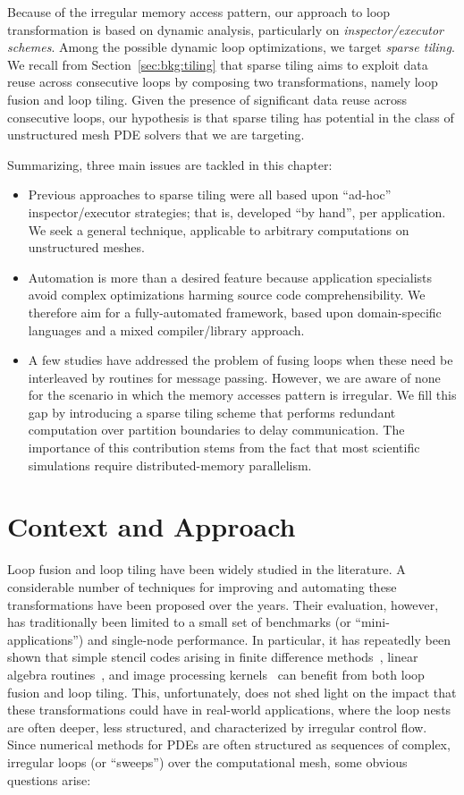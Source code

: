 Because of the irregular memory access pattern, our approach to loop transformation is based on dynamic analysis, particularly on \textit{inspector/executor schemes}. Among the possible dynamic loop optimizations, we target \textit{sparse tiling}. We recall from Section~\ref{sec:bkg:tiling} that sparse tiling aims to exploit data reuse across consecutive loops by composing two transformations, namely loop fusion and loop tiling. Given the presence of significant data reuse across consecutive loops, our hypothesis is that sparse tiling has potential in the class of unstructured mesh PDE solvers that we are targeting.

Summarizing, three main issues are tackled in this chapter:

\begin{itemize}
\item Previous approaches to sparse tiling were all based upon ``ad-hoc'' inspector/executor strategies; that is, developed ``by hand'', per application. We seek a general technique, applicable to arbitrary computations on unstructured meshes.
\item Automation is more than a desired feature because application specialists avoid complex optimizations harming source code comprehensibility. We therefore aim for a fully-automated framework, based upon domain-specific languages and a mixed compiler/library approach.
\item A few studies have addressed the problem of fusing loops when these need be interleaved by routines for message passing. However, we are aware of none for the scenario in which the memory accesses pattern is irregular. We fill this gap by introducing a sparse tiling scheme that performs redundant computation over partition boundaries to delay communication. The importance of this contribution stems from the fact that most scientific simulations require distributed-memory parallelism.
\end{itemize}

\section{Context and Approach}
\label{sec:tiling:struct}
Loop fusion and loop tiling have been widely studied in the literature. A considerable number of techniques for improving and automating these transformations have been proposed over the years. Their evaluation, however, has traditionally been limited to a small set of benchmarks (or ``mini-applications'') and single-node performance. In particular, it has repeatedly been shown that simple stencil codes arising in finite difference methods~\citep{vect-tiled-ho-fd,ics-stencil-tiling,cohen-timetiling}, linear algebra routines~\citep{qr-fact-tiled,blas-tiling}, and image processing kernels~\citep{Halide} can benefit from both loop fusion and loop tiling. This, unfortunately, does not shed light on the impact that these transformations could have in real-world applications, where the loop nests are often deeper, less structured, and characterized by irregular control flow. Since numerical methods for PDEs are often structured as sequences of complex, irregular loops (or ``sweeps'') over the computational mesh, some obvious questions arise: 

